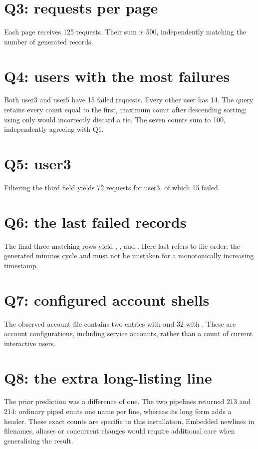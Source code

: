 \documentclass{../latex/utmreport}
\begin{document}
\section{Q3: requests per page}
Each page receives 125 requests. Their sum is 500, independently matching the
number of generated records.
\section{Q4: users with the most failures}
Both user3 and user5 have 15 failed requests. Every other user has 14. The query
retains every count equal to the first, maximum count after descending sorting;
using only  would incorrectly discard a tie. The seven counts sum
to 100, independently agreeing with Q1.
\section{Q5: user3}
Filtering the third field yields 72 requests for user3, of which 15 failed.
\section{Q6: the last failed records}
The final three matching rows yield , , and
. Here last refers to file order: the generated minutes cycle
and must not be mistaken for a monotonically increasing timestamp.
\section{Q7: configured account shells}
The observed account file contains two entries with  and 32 with
. These are account configurations, including service
accounts, rather than a count of current interactive users.
\section{Q8: the extra long-listing line}
The prior prediction was a difference of one. The two pipelines returned 213 and
214: ordinary piped  emits one name per line, whereas its long form adds
a  header. These exact counts are specific to this installation.
Embedded newlines in filenames, aliases or concurrent changes would require
additional care when generalising the result.
\end{document}
